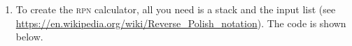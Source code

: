 \documentclass[10pt, letterpaper, acro-macros]{python-problem}
\begin{document}
\begin{enumerate}
\begin{pycode*}{gobble=6}
          for v in x.values():
              cost += random.randint(0, 10) * v

          return cost

      talkToBill(lambda x: sumItems(x))
    \end{pycode*}

    Or with a generator.
    \begin{pycode*}{gobble=6}
      import random
      talkToBill(lambda x:
          sum(v*random.randint(0, 10) for v in x.values()))
    \end{pycode*}


  \item To create the \textsc{rpn} calculator, all you need is a stack and
    the input list (see
    \url{https://en.wikipedia.org/wiki/Reverse_Polish_notation}). The code
    is shown below.


\end{enumerate}
\end{document}
